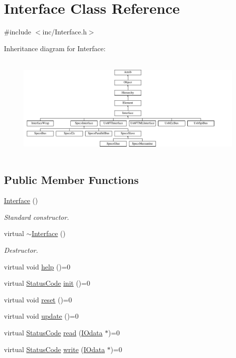 \hypertarget{classInterface}{}\section{Interface Class Reference}
\label{classInterface}


{\ttfamily \#include $<$inc/\+Interface.\+h$>$}

Inheritance diagram for Interface\+:\begin{figure}[H]
\begin{center}
\leavevmode
\includegraphics[height=5.161290cm]{classInterface}
\end{center}
\end{figure}
\subsection*{Public Member Functions}
\begin{DoxyCompactItemize}
\item 
\hyperlink{classInterface_a4406d74c75bdfe150bf72be1f1cda8b1}{Interface} ()
\begin{DoxyCompactList}\small\item\em Standard constructor. \end{DoxyCompactList}\item 
virtual \hyperlink{classInterface_a19179888f29f18f1be54a3dfe98f68c0}{$\sim$\+Interface} ()
\begin{DoxyCompactList}\small\item\em Destructor. \end{DoxyCompactList}\item 
virtual void \hyperlink{classInterface_aedd3cf1d964c837e7848ccf81dc9c760}{help} ()=0
\item 
virtual \hyperlink{classStatusCode}{Status\+Code} \hyperlink{classInterface_a1d095c113b1e89d1f5f68323856fee63}{init} ()=0
\item 
virtual void \hyperlink{classInterface_a4d44329cea9981a9e0392eaaf99efadd}{reset} ()=0
\item 
virtual void \hyperlink{classInterface_a30e71ffbe36091df9f7c0838dd4b60d2}{update} ()=0
\item 
virtual \hyperlink{classStatusCode}{Status\+Code} \hyperlink{classInterface_a99136b67c8e6cbcaa0477c36940ac2ef}{read} (\hyperlink{classIOdata}{I\+Odata} $\ast$)=0
\item 
virtual \hyperlink{classStatusCode}{Status\+Code} \hyperlink{classInterface_ad665cacbaf490a26c1c4ba192022e68a}{write} (\hyperlink{classIOdata}{I\+Odata} $\ast$)=0
\end{DoxyCompactItemize}
